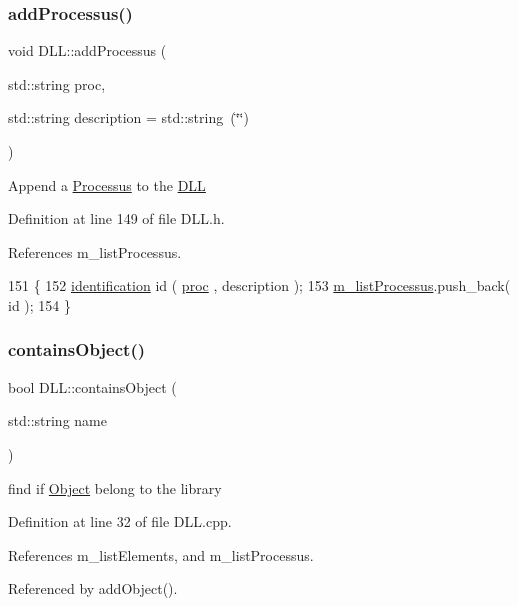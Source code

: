 \subsubsection{\texorpdfstring{add\+Processus()}{addProcessus()}}
{\footnotesize\ttfamily void D\+L\+L\+::add\+Processus (\begin{DoxyParamCaption}\item[{std\+::string}]{proc,  }\item[{std\+::string}]{description = {\ttfamily std\+:\+:string~(\char`\"{}\char`\"{})} }\end{DoxyParamCaption})\hspace{0.3cm}{\ttfamily [inline]}}

Append a \hyperlink{classProcessus}{Processus} to the \hyperlink{classDLL}{D\+LL} 

Definition at line 149 of file D\+L\+L.\+h.



References m\+\_\+list\+Processus.


\begin{DoxyCode}
151     \{
152     \hyperlink{classDLL_aa2df9e9226052bfa93a6df56f1ca689b}{identification} id ( \hyperlink{namespaceproc}{proc} , description ); 
153     \hyperlink{classDLL_a197e92b990184a27a74f4a0456897bd5}{m\_listProcessus}.push\_back( \textcolor{keywordtype}{id} );
154   \}
\end{DoxyCode}
\mbox{\label{classDLL_af1aada8b1d5632bfac61639f997b9753}} 
\subsubsection{\texorpdfstring{contains\+Object()}{containsObject()}}
{\footnotesize\ttfamily bool D\+L\+L\+::contains\+Object (\begin{DoxyParamCaption}\item[{std\+::string}]{name }\end{DoxyParamCaption})}

find if \hyperlink{classObject}{Object} belong to the library 

Definition at line 32 of file D\+L\+L.\+cpp.



References m\+\_\+list\+Elements, and m\+\_\+list\+Processus.



Referenced by add\+Object().


